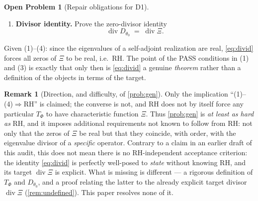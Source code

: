 \documentclass[12pt,a4paper]{amsart}
\theoremstyle{plain}
\theoremstyle{definition}
\newtheorem{remark}[theorem]{Remark}
\newtheorem{problem}[theorem]{Open Problem}
\begin{document}
\begin{problem}[Repair obligations for D1]
\begin{enumerate}[label=(\arabic*)]
\begin{equation}
          \end{equation}
          with the order of each zero equal to the (separately specified)
          spectral multiplicity, and with the real normalisation
          $D_{\theta_0}^{\#}=D_{\theta_0}$.  \emph{PASS condition.}
          $D_{\theta_0}$ may \emph{not} be defined as a canonical product
          over prescribed points (in particular not as $\Xi$, nor over
          $\{\gamma_n\}$); it must arise from $T_\Phi$ by the fixed
          procedure above.
    \item \textbf{Divisor identity.}  Prove the zero-divisor identity
          \begin{equation}\label{eq:divid}
            \operatorname{div} D_{\theta_0}
            \;=\;
            \operatorname{div}\Xi .
          \end{equation}
  \end{enumerate}
  Given (1)--(4): since the eigenvalues of a self-adjoint realization are
  real, \cref{eq:divid} forces all zeros of $\Xi$ to be real, i.e.\ RH.
  The point of the PASS conditions in (1) and (3) is exactly that only
  then is \cref{eq:divid} a genuine \emph{theorem} rather than a
  definition of the objects in terms of the target.
\end{problem}

\begin{remark}[Direction, and difficulty, of \cref{prob:gen}]\label{rem:coreL-is-RH}
  Only the implication ``(1)--(4)$\Rightarrow$RH'' is claimed; the
  converse is not, and RH does not by itself force any particular
  $T_\Phi$ to have characteristic function $\Xi$.  Thus \cref{prob:gen} is
  \emph{at least as hard as} RH, and it imposes additional requirements
  not known to follow from RH: not only that the zeros of $\Xi$ be real
  but that they coincide, with order, with the eigenvalue divisor of a
  \emph{specific} operator.
  Contrary to a claim in an earlier draft of this audit, this does not
  mean there is no RH-independent acceptance criterion: the identity
  \cref{eq:divid} is perfectly well-posed to \emph{state} without knowing
  RH, and its target $\operatorname{div}\Xi$ is explicit.  What is missing
  is different --- a rigorous definition of $T_\Phi$ and $D_{\theta_0}$,
  and a proof relating the latter to the already explicit target divisor
  $\operatorname{div}\Xi$ (\cref{rem:undefined}).  This paper resolves
  none of it.
\end{remark}
\end{document}
